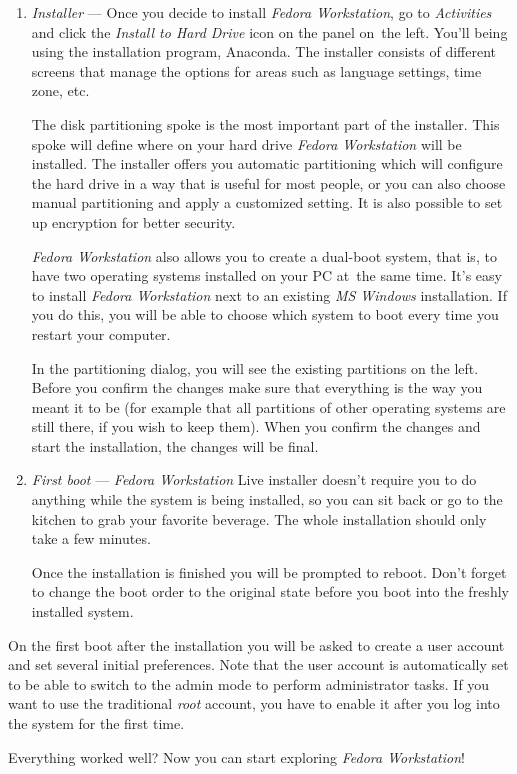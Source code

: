 \begin{enumerate}
\newpage
\item\emph{Installer} --- Once you decide to install \emph{Fedora Workstation}, go to \emph{Activities} and click the \emph{Install to Hard Drive} icon on the panel on~the left. You'll being using the installation program, Anaconda. The installer consists of different screens that manage the options for areas such as language settings, time zone, etc.

The disk partitioning spoke is the most important part of the installer. This spoke will define where on your hard drive \emph{Fedora Workstation} will be installed. The installer offers you automatic partitioning which will configure the hard drive in a way that is useful for most people, or you can also choose manual partitioning and apply a customized setting. It is also possible to set up encryption for better security.

\emph{Fedora Workstation} also allows you to create a dual-boot system, that is, to have two operating systems installed on your PC at~the same time. It's easy to install \emph{Fedora Workstation} next to an existing \emph{MS Windows} installation. If you do this, you will be able to choose which system to boot every time you restart your computer.

In the partitioning dialog, you will see the existing partitions on the left. Before you confirm the changes make sure that everything is the way you meant it to be (for example that all partitions of other operating systems are still there, if you wish to keep them). When you confirm the changes and start the installation, the changes will be final.

\item\emph{First boot} --- \emph{Fedora Workstation} Live installer doesn't require you to do anything while the system is being installed, so you can sit back or go to the kitchen to grab your favorite beverage. The whole installation should only take a few minutes.

Once the installation is finished you will be prompted to reboot. Don't forget to change the boot order to the original state before you boot into the freshly installed system.
\end{enumerate}

On the first boot after the installation you will be asked to create a user account and set several initial preferences. Note that the user account is automatically set to be able to switch to the admin mode to perform administrator tasks. If you want to use the traditional \emph{root} account, you have to enable it after you log into the system for the first time.

Everything worked well? Now you can start exploring \emph{Fedora Workstation}!
\endinput
